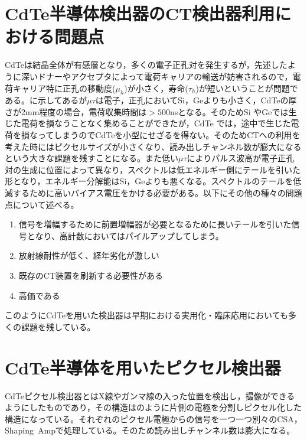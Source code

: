 \section{CdTe半導体検出器のCT検出器利用における問題点\label{sec:CdTe}}

CdTeは結晶全体が有感層となり，多くの電子正孔対を発生するが，先述したように深いドナーやアクセプタによって電荷キャリアの輸送が妨害されるので，電荷キャリア特に正孔の移動度($\mu_h$)が小さく，寿命($\tau_h$)が短いということが問題である。に示してあるが$\mu\tau$は電子，正孔においてSi，Geよりも小さく，CdTeの厚さが2mm程度の場合，電荷収集時間は$>500$nsとなる。そのためSi やGeでは生じた電荷を損なうことなく集めることができたが，CdTe では，途中で生じた電荷を損なってしまうのでCdTeを小型にせざるを得ない。そのためCTへの利用を考えた時にはピクセルサイズが小さくなり、読み出しチャンネル数が膨大になるという大きな課題を残すことになる。また低い$\mu\tau$によりパルス波高が電子正孔対の生成に位置によって異なり，スペクトルは低エネルギー側にテールを引いた形となり，エネルギー分解能はSi，Geよりも悪くなる。スペクトルのテールを低減するために高いバイアス電圧をかける必要がある。以下にその他の種々の問題点について述べる。

\begin{enumerate}
\item 信号を増幅するために前置増幅器が必要となるために長いテールを引いた信号となり、高計数においてはパイルアップしてしまう。
\item 放射線耐性が低く、経年劣化が激しい
\item 既存のCT装置を刷新する必要性がある
\item 高価である
\end{enumerate}
このようにCdTeを用いた検出器は早期における実用化・臨床応用においても多くの課題を残している。

%

\section{CdTe半導体を用いたピクセル検出器}
CdTeピクセル検出器とはX線やガンマ線の入った位置を検出し，撮像ができるようにしたものであり，その構造はのように片側の電極を分割しピクセル化した構造になっている。それぞれのピクセル電極からの信号を一つ一つ別々のCSA，Shaping\ Ampで処理している。そのため読み出しチャンネル数は膨大になる。

